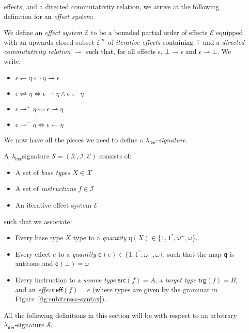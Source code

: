 \documentclass[acmsmall,screen,review]{acmart}
\newcommand{\mc}[1]{\ensuremath{\mathcal{#1}}}
\newcommand{\ms}[1]{\ensuremath{\mathsf{#1}}}
\newcommand{\subiterssa}{\(\lambda_{\ms{iter}}\)}
\newcommand{\rightmove}{\rightharpoonup}
\newcommand{\leftmove}{\leftharpoondown}
\newcommand{\slides}{\rightleftharpoons}
\newcommand{\delq}{1^?}
\newcommand{\cpyq}{\omega^+}
\newcommand{\topq}{\omega}
\begin{document}
effects, and a directed commutativity relation, we arrive at the following definition for an
\emph{effect system}:
\begin{definition}
  We define an \emph{effect system} $\mc{E}$ to be a bounded partial order of effects $\mc{E}$
  equipped with an upwards closed subset $\mc{E}^\infty$ of \emph{iterative effects} containing
  $\top$ and a \emph{directed commutativity relation} $\rightmove$ such that, for all effects
  $\epsilon$, $\bot \rightmove \epsilon$ and $\epsilon \rightmove \bot$. We write:
  \begin{itemize}
    \item $\epsilon \leftmove \eta \iff \eta \rightmove \epsilon$
    \item $\epsilon \slides \eta \iff \epsilon \rightmove \eta \land \epsilon \leftmove \eta$
    \item $\epsilon \rightmove^+ \eta \iff \epsilon \rightmove \eta$
    \item $\epsilon \rightmove^- \eta \iff \epsilon \leftmove \eta$
  \end{itemize}
\end{definition}

We now have all the pieces we need to define a \subiterssa{}-\emph{signature}.

\begin{definition}[\subiterssa-signature]
  A \subiterssa signature $\mc{S} = (\mc{X}, \mc{I}, \mc{E})$ consists of:
  \begin{itemize}
    \item A set of \emph{base types} $X \in \mc{X}$
    \item A set of \emph{instructions} $f \in \mc{I}$
    \item An iterative effect system $\mc{E}$
  \end{itemize}
  such that we associate:
  \begin{itemize}
    \item Every base type $X$ type to a \emph{quantity} $\ms{q}(X) \in \{1, \delq, \cpyq, \topq\}$.
    \item Every effect $e$ to a \emph{quantity} $\ms{q}(e) \in \{1, \delq, \cpyq, \topq\}$, such
    that the map $\ms{q}$ is antitone and $\ms{q}(\bot) = \topq$
    \item Every instruction to a \emph{source type} $\ms{src}(f) = A$, a \emph{target type}
    $\ms{trg}(f) = B$, and an \emph{effect} $\ms{eff}(f) = e$ (where types are given by the grammar
    in Figure~\ref{fig:subiterssa-syntax}).
  \end{itemize}
\end{definition}
All the following definitions in this section will be with respect to an arbitrary
\subiterssa{}-signature $\mc{S}$. 
\end{document}
